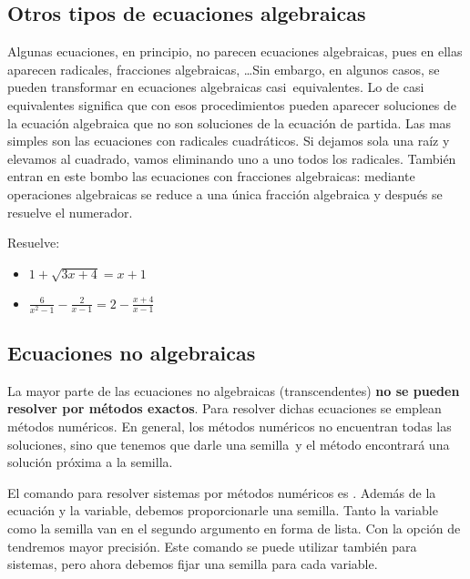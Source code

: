 \documentclass[a4paper,10pt, draft]{article}
\newcommand{\com}[1]{\textbf{\color{blue}{#1}}}
\newenvironment{ejer}{\begin{tcolorbox}[center title, title=Ejercicios,
fonttitle=\sffamily\bfseries,colback=blue!5,colframe=orange]}{\end{tcolorbox}}
\begin{document}
\subsection{Otros tipos de ecuaciones algebraicas}

Algunas ecuaciones, en principio, no parecen ecuaciones algebraicas, pues  en ellas aparecen radicales, fracciones algebraicas, \dots  Sin embargo, en algunos casos, se pueden transformar  en ecuaciones algebraicas \guillemotleft casi\guillemotright\  equivalentes. Lo de casi equivalentes significa que con esos procedimientos pueden aparecer soluciones de la ecuación algebraica que no son soluciones de la ecuación de partida. Las mas simples son las ecuaciones con radicales cuadráticos. Si dejamos sola una raíz y elevamos al cuadrado, vamos eliminando uno a uno todos los radicales. También entran en este bombo las ecuaciones con fracciones algebraicas: mediante operaciones algebraicas se reduce a una única fracción algebraica y después se \guillemotleft resuelve el numerador\guillemotright.





\begin{ejer}

Resuelve:

\begin{itemize}

\item $1+ \sqrt{3x+4}=x+1$


\item $\displaystyle \frac{6}{x^2-1}-\frac{2}{x-1}= 2 -\frac{x+4}{x-1}$

\end{itemize}

\end{ejer}  \newpage

\subsection{Ecuaciones no algebraicas}

La mayor parte de las ecuaciones no algebraicas (transcendentes) \textbf{no se pueden resolver por métodos exactos}. Para resolver dichas ecuaciones  se emplean métodos numéricos. En general, los métodos numéricos no encuentran todas las soluciones, sino que tenemos que darle una \guillemotleft semilla\guillemotright\ y el método encontrará una solución próxima a la semilla. 



 El comando para resolver sistemas por métodos numéricos es \com{FindRoot[p==q,\{x,s\}]}. Además de la ecuación y la variable, debemos proporcionarle una semilla. Tanto la variable como la semilla van en el segundo argumento en forma de lista.
Con la opción  de  \com{WorkingPrecision} tendremos mayor precisión. Este comando se puede utilizar también para sistemas, pero ahora debemos fijar una semilla para cada variable.
\end{document}
